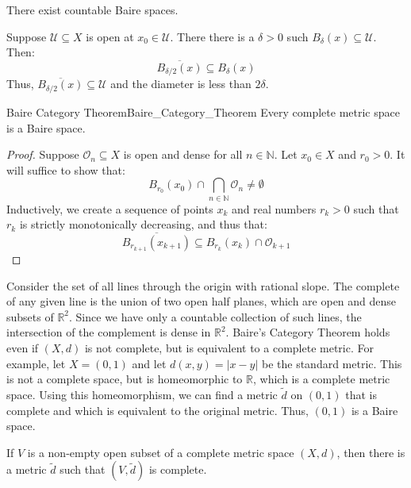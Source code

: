     \begin{theorem}
        There exist countable Baire spaces.
    \end{theorem}
    Suppose $\mathcal{U}\subseteq{X}$ is open at
    $x_{0}\in\mathcal{U}$. There there is a $\delta>0$ such
    $B_{\delta}(x)\subseteq\mathcal{U}$. Then:
    \begin{equation}
        \overline{B_{\delta/2}(x)}\subseteq{B}_{\delta}(x)
    \end{equation}
    Thus, $\overline{B_{\delta/2}(x)}\subseteq\mathcal{U}$
    and the diameter is less than $2\delta$.
    \begin{ltheorem}{Baire Category Theorem}{Baire_Category_Theorem}
        Every complete metric space is a Baire space.
    \end{ltheorem}
    \begin{proof}
        Suppose $\mathcal{O}_{n}\subseteq{X}$ is open and
        dense for all $n\in\mathbb{N}$. Let $x_{0}\in{X}$ and
        $r_{0}>0$. It will suffice to show that:
        \begin{equation}
            B_{r_{0}}(x_{0})\cap\bigcap_{n\in\mathbb{N}}
                \mathcal{O}_{n}\ne\emptyset
        \end{equation}
        Inductively, we create a sequence of points $x_{k}$
        and real numbers $r_{k}>0$ such that $r_{k}$ is strictly
        monotonically decreasing, and thus that:
        \begin{equation}
            \overline{B_{r_{k+1}}(x_{k+1})}
            \subseteq{B}_{r_{k}}(x_{k})\cap\mathcal{O}_{k+1}
        \end{equation}
    \end{proof}
    Consider the set of all lines through the origin with
    rational slope. The complete of any given line is the
    union of two open half planes, which are open and dense
    subsets of $\mathbb{R}^{2}$. Since we have only a countable
    collection of such lines, the intersection of the complement
    is dense in $\mathbb{R}^{2}$. Baire's Category Theorem
    holds even if $(X,d)$ is not complete, but is equivalent
    to a complete metric. For example, let $X=(0,1)$ and let
    $d(x,y)=|x-y|$ be the standard metric. This is not a
    complete space, but is homeomorphic to $\mathbb{R}$,
    which is a complete metric space. Using this homeomorphism,
    we can find a metric $\tilde{d}$ on $(0,1)$ that is complete
    and which is equivalent to the original metric. Thus,
    $(0,1)$ is a Baire space.
    \begin{theorem}
        If $V$ is a non-empty open subset of a complete metric
        space $(X,d)$, then there is a metric $\tilde{d}$ such
        that $(V,\tilde{d})$ is complete.
    \end{theorem}
